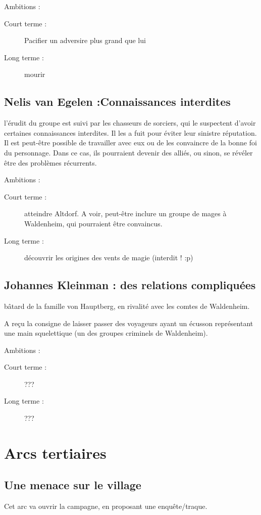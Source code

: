 \documentclass[10pt,a4paper]{book}
\begin{document}
Ambitions :
\begin{description}
\item[Court terme :]Pacifier un adversire plus grand que lui
\item[Long terme :]mourir
\end{description}
\subsection{Nelis van Egelen :Connaissances interdites}
l'érudit du groupe est suivi par les chasseurs de sorciers, qui le suspectent d'avoir certaines connaissances interdites. Il les a fuit pour éviter leur sinistre réputation. Il est peut-être possible de travailler avec eux ou de les convaincre de la bonne foi du personnage. Dans ce cas, ils pourraient devenir des alliés, ou sinon, se révéler être des problèmes récurrents.

Ambitions :
\begin{description}
\item[Court terme :]atteindre Altdorf. A voir, peut-être inclure un groupe de mages à Waldenheim, qui pourraient être convaincus.
\item[Long terme :]découvrir les origines des vents de magie (interdit ! :p)
\end{description}
\subsection{Johannes Kleinman : des relations compliquées}
bâtard de la famille von Hauptberg, en rivalité avec les comtes de Waldenheim.

A reçu la consigne de laisser passer des voyageurs ayant un écusson représentant une main squelettique (un des groupes criminels de Waldenheim).

Ambitions :
\begin{description}
\item[Court terme :]???
\item[Long terme :]???
\end{description}
\section{Arcs tertiaires}
\subsection{Une menace sur le village}
Cet arc va ouvrir la campagne, en proposant une enquête/traque.
\end{document}

